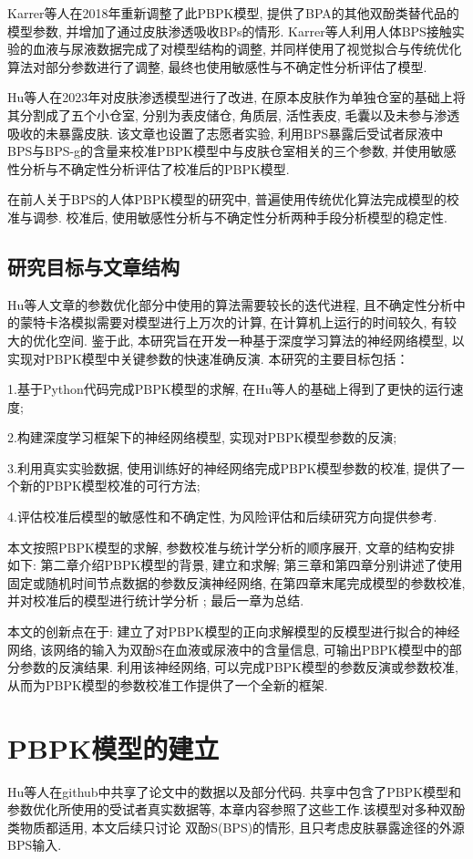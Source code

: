 \documentclass[a4paper,punct=banjiao,twoside]{ctexrep}
\theoremstyle{plain}
\theoremstyle{definition}
\theoremstyle{remark}
\begin{document}
Karrer等人\cite{9}在2018年重新调整了此PBPK模型, 提供了BPA的其他双酚类替代品的模型参数, 并增加了通过皮肤渗透吸收BPs的情形. Karrer等人利用人体BPS接触实验的血液与尿液数据完成了对模型结构的调整, 并同样使用了视觉拟合与传统优化算法对部分参数进行了调整, 最终也使用敏感性与不确定性分析评估了模型.

Hu等人\cite{11}在2023年对皮肤渗透模型进行了改进, 在原本皮肤作为单独仓室的基础上将其分割成了五个小仓室, 分别为表皮储仓, 角质层, 活性表皮, 毛囊以及未参与渗透吸收的未暴露皮肤.
该文章也设置了志愿者实验, 利用BPS暴露后受试者尿液中BPS与BPS-g的含量来校准PBPK模型中与皮肤仓室相关的三个参数, 并使用敏感性分析与不确定性分析评估了校准后的PBPK模型.

在前人关于BPS的人体PBPK模型的研究中, 普遍使用传统优化算法完成模型的校准与调参. 校准后, 使用敏感性分析与不确定性分析两种手段分析模型的稳定性.
\section{研究目标与文章结构} 

Hu等人\cite{11}文章的参数优化部分中使用的算法需要较长的迭代进程, 且不确定性分析中的蒙特卡洛模拟需要对模型进行上万次的计算, 在计算机上运行的时间较久, 有较大的优化空间. 
鉴于此, 本研究旨在开发一种基于深度学习算法的神经网络模型, 以实现对PBPK模型中关键参数的快速准确反演. 本研究的主要目标包括：

1.基于Python代码完成PBPK模型的求解, 在Hu等人的基础上得到了更快的运行速度; 

2.构建深度学习框架下的神经网络模型, 实现对PBPK模型参数的反演;

3.利用真实实验数据, 使用训练好的神经网络完成PBPK模型参数的校准, 提供了一个新的PBPK模型校准的可行方法;

4.评估校准后模型的敏感性和不确定性, 为风险评估和后续研究方向提供参考.

本文按照PBPK模型的求解, 参数校准与统计学分析的顺序展开, 文章的结构安排如下: 第二章介绍PBPK模型的背景, 建立和求解;
第三章和第四章分别讲述了使用固定或随机时间节点数据的参数反演神经网络, 在第四章末尾完成模型的参数校准, 并对校准后的模型进行统计学分析 ; 
最后一章为总结.

本文的创新点在于: 建立了对PBPK模型的正向求解模型的反模型进行拟合的神经网络, 该网络的输入为双酚S在血液或尿液中的含量信息, 可输出PBPK模型中的部分参数的反演结果.
利用该神经网络, 可以完成PBPK模型的参数反演或参数校准, 从而为PBPK模型的参数校准工作提供了一个全新的框架.

\chapter{PBPK模型的建立}
Hu等人\cite{11}在github中共享了论文中的数据以及部分代码. 共享中包含了PBPK模型和参数优化所使用的受试者真实数据等, 本章内容参照了这些工作.该模型对多种双酚类物质都适用, 本文后续只讨论
双酚S(BPS)的情形, 且只考虑皮肤暴露途径的外源BPS输入.
\end{document}
